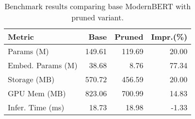 \begin{table}[htb]
\centering
\scriptsize
\setlength{\tabcolsep}{3pt}
\begin{tabular}{lrrr}
\toprule
\textbf{Metric} & \textbf{Base} & \textbf{Pruned} & \textbf{Impr.(\%)} \\
\midrule
Params (M) & 149.61 & 119.69 & 20.00 \\
Embed. Params (M) & 38.68 & 8.76 & 77.34 \\
Storage (MB) & 570.72 & 456.59 & 20.00 \\
GPU Mem (MB) & 823.06 & 700.99 & 14.83 \\
Infer. Time (ms) & 18.73 & 18.98 & -1.33 \\
\bottomrule
\end{tabular}
\caption{Benchmark results comparing base ModernBERT with pruned variant.}
\label{tab:benchmark_results}
\end{table} 